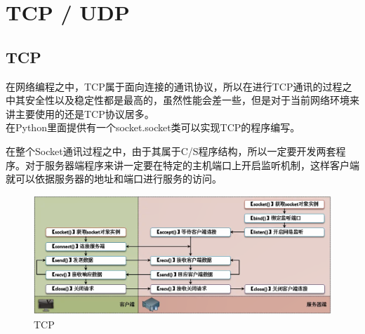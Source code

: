 \newpage

\section{TCP / UDP}

\subsection{TCP}

在网络编程之中，TCP属于面向连接的通讯协议，所以在进行TCP通讯的过程之中其安全性以及稳定性都是最高的，虽然性能会差一些，但是对于当前网络环境来讲主要使用的还是TCP协议居多。\\

在Python里面提供有一个socket.socket类可以实现TCP的程序编写。

\begin{table}[H]
	\centering
	\caption{socket.socket类}
\end{table}

在整个Socket通讯过程之中，由于其属于C/S程序结构，所以一定要开发两套程序。对于服务器端程序来讲一定要在特定的主机端口上开启监听机制，这样客户端就可以依据服务器的地址和端口进行服务的访问。

\begin{figure}[H]
	\centering
	\includegraphics[scale=0.6]{img/C12/12-2/1.png}
	\caption{TCP}
\end{figure}

